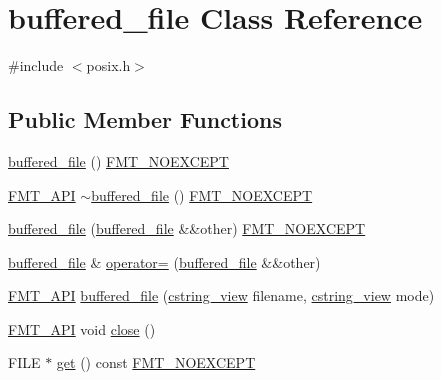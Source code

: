\hypertarget{classbuffered__file}{}\section{buffered\+\_\+file Class Reference}
\label{classbuffered__file}


{\ttfamily \#include $<$posix.\+h$>$}

\subsection*{Public Member Functions}
\begin{DoxyCompactItemize}
\item 
\hyperlink{classbuffered__file_ab89aef2bb026cd34b3e8596fe8be52eb}{buffered\+\_\+file} () \hyperlink{core_8h_aef128913e8400683b1cbd1a3a2e11df3}{F\+M\+T\+\_\+\+N\+O\+E\+X\+C\+E\+PT}
\item 
\hyperlink{core_8h_a9a4960b70582ed2620911a0b75dce0b5}{F\+M\+T\+\_\+\+A\+PI} \hyperlink{classbuffered__file_ac39deccbccad32bb79d77471cc76b480}{$\sim$buffered\+\_\+file} () \hyperlink{core_8h_aef128913e8400683b1cbd1a3a2e11df3}{F\+M\+T\+\_\+\+N\+O\+E\+X\+C\+E\+PT}
\item 
\hyperlink{classbuffered__file_a67baacfe70407f0006450c2084ea0b63}{buffered\+\_\+file} (\hyperlink{classbuffered__file}{buffered\+\_\+file} \&\&other) \hyperlink{core_8h_aef128913e8400683b1cbd1a3a2e11df3}{F\+M\+T\+\_\+\+N\+O\+E\+X\+C\+E\+PT}
\item 
\hyperlink{classbuffered__file}{buffered\+\_\+file} \& \hyperlink{classbuffered__file_a158ef2fb37854e3c6799dd40a72fa56b}{operator=} (\hyperlink{classbuffered__file}{buffered\+\_\+file} \&\&other)
\item 
\hyperlink{core_8h_a9a4960b70582ed2620911a0b75dce0b5}{F\+M\+T\+\_\+\+A\+PI} \hyperlink{classbuffered__file_a880e91bb129936d5e35f00fde66349e5}{buffered\+\_\+file} (\hyperlink{posix_8h_ae8eb4eb4ba15f0c8755e1d5c8e7c07d9}{cstring\+\_\+view} filename, \hyperlink{posix_8h_ae8eb4eb4ba15f0c8755e1d5c8e7c07d9}{cstring\+\_\+view} mode)
\item 
\hyperlink{core_8h_a9a4960b70582ed2620911a0b75dce0b5}{F\+M\+T\+\_\+\+A\+PI} void \hyperlink{classbuffered__file_a2756c39b06594666c5a8712873d7c878}{close} ()
\item 
F\+I\+LE $\ast$ \hyperlink{classbuffered__file_accd1dfb78afe54625f990b03f56f8435}{get} () const \hyperlink{core_8h_aef128913e8400683b1cbd1a3a2e11df3}{F\+M\+T\+\_\+\+N\+O\+E\+X\+C\+E\+PT}
\item 

\end{DoxyCompactItemize}
